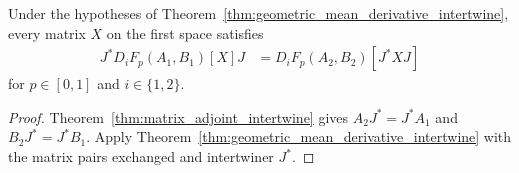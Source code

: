\begin{theorem}
  \label{thm:geometric_mean_derivative_compress}
  \leanok
  Under the hypotheses of
  Theorem~\ref{thm:geometric_mean_derivative_intertwine},
  every matrix $X$ on the first space satisfies
  \begin{align*}
    J^*D_iF_p(A_1,B_1)[X]J
      &=D_iF_p(A_2,B_2)[J^*XJ]
  \end{align*}
  for $p\in[0,1]$ and $i\in\{1,2\}$.
\end{theorem}

\begin{proof}
  \leanok
  Theorem~\ref{thm:matrix_adjoint_intertwine} gives
  $A_2J^*=J^*A_1$ and $B_2J^*=J^*B_1$.
  Apply Theorem~\ref{thm:geometric_mean_derivative_intertwine}
  with the matrix pairs exchanged and intertwiner $J^*$.
\end{proof}
